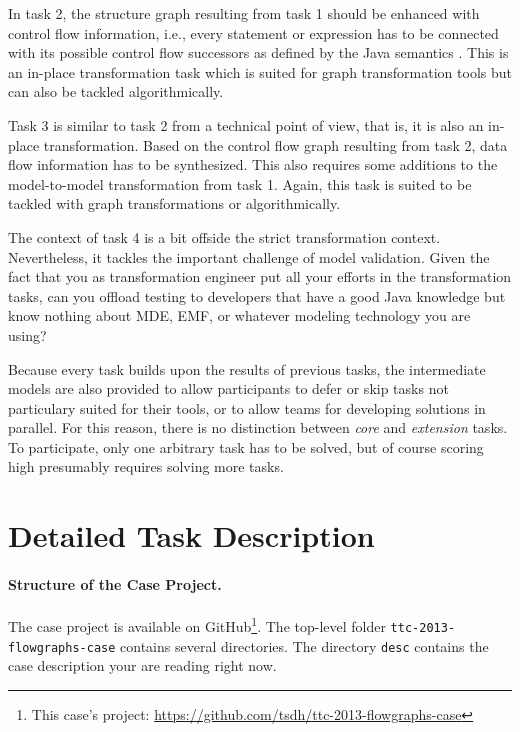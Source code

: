 \documentclass[11pt]{article}
\begin{document}
In task 2, the structure graph resulting from task 1 should be enhanced with
control flow information, i.e., every statement or expression has to be
connected with its possible control flow successors as defined by the Java
semantics \cite{Java7Spec}.  This is an in-place transformation task which is
suited for graph transformation tools but can also be tackled algorithmically.

Task 3 is similar to task 2 from a technical point of view, that is, it is also
an in-place transformation.  Based on the control flow graph resulting from
task 2, data flow information has to be synthesized.  This also requires some
additions to the model-to-model transformation from task 1.  Again, this task
is suited to be tackled with graph transformations or algorithmically.

The context of task 4 is a bit offside the strict transformation context.
Nevertheless, it tackles the important challenge of model validation.  Given
the fact that you as transformation engineer put all your efforts in the
transformation tasks, can you offload testing to developers that have a good
Java knowledge but know nothing about MDE, EMF, or whatever modeling technology
you are using?

Because every task builds upon the results of previous tasks, the intermediate
models are also provided to allow participants to defer or skip tasks not
particulary suited for their tools, or to allow teams for developing solutions
in parallel.  For this reason, there is no distinction between \emph{core} and
\emph{extension} tasks.  To participate, only one arbitrary task has to be
solved, but of course scoring high presumably requires solving more tasks.


\section{Detailed Task Description}
\label{sec:task-descr}

\paragraph{Structure of the Case Project.}

The case project is available on GitHub\footnote{This case's project:
  \url{https://github.com/tsdh/ttc-2013-flowgraphs-case}}. The top-level folder
\verb|ttc-2013-flowgraphs-case| contains several directories.  The directory
\verb|desc| contains the case description your are reading right now.
\end{document}
